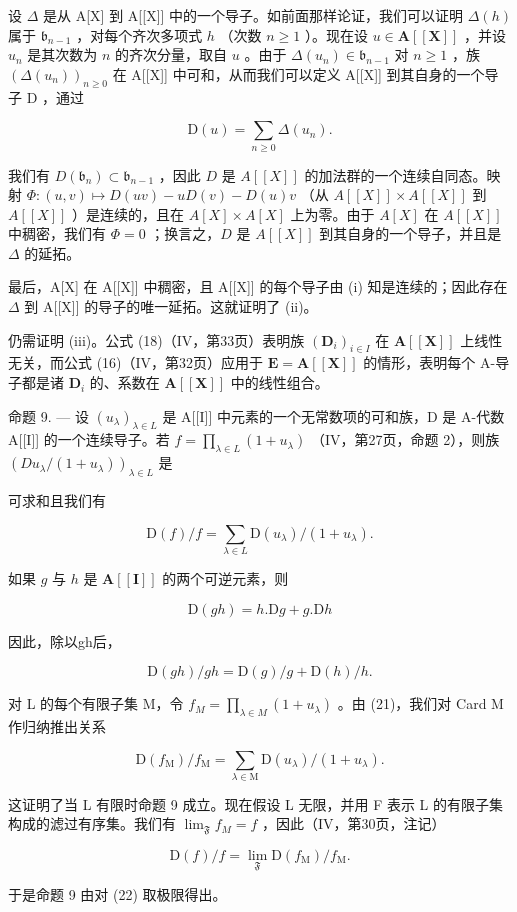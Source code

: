 设 \(\Delta\) 是从 A{[}X{]} 到 A{[}{[}X{]}{]} 中的一个导子。如前面那样论证，我们可以证明 \(\Delta(h)\) 属于 \(\mathfrak{b}_{n-1}\) ，对每个齐次多项式 \(h\) （次数 \(n \geqslant 1\) ）。现在设 \(u \in \mathbf{A}[[\mathbf{X}]]\) ，并设 \(u_n\) 是其次数为 \(n\) 的齐次分量，取自 \(u\) 。由于 \(\Delta(u_n) \in \mathfrak{b}_{n-1}\) 对 \(n \geqslant 1\) ，族 \((\Delta(u_n))_{n \geqslant 0}\) 在 A{[}{[}X{]}{]} 中可和，从而我们可以定义 A{[}{[}X{]}{]} 到其自身的一个导子 D ，通过

\[
\mathrm{D} (u) = \sum_ {n \geqslant 0} \Delta \left(u _ {n}\right).
\]

我们有 \(D(\mathfrak{b}_n) \subset \mathfrak{b}_{n-1}\) ，因此 \(D\) 是 \(A[[X]]\) 的加法群的一个连续自同态。映射 \(\Phi: (u, v) \mapsto D(uv) - uD(v) - D(u)v\) （从 \(A[[X]] \times A[[X]]\) 到 \(A[[X]]\) ）是连续的，且在 \(A[X] \times A[X]\) 上为零。由于 \(A[X]\) 在 \(A[[X]]\) 中稠密，我们有 \(\Phi = 0\) ；换言之，\(D\) 是 \(A[[X]]\) 到其自身的一个导子，并且是 \(\Delta\) 的延拓。

最后，A{[}X{]} 在 A{[}{[}X{]}{]} 中稠密，且 A{[}{[}X{]}{]} 的每个导子由 (i) 知是连续的；因此存在 \(\Delta\) 到 A{[}{[}X{]}{]} 的导子的唯一延拓。这就证明了 (ii)。

仍需证明 (iii)。公式 (18)（IV，第33页）表明族 \((\mathbf{D}_i)_{i\in I}\) 在 \(\mathbf{A}[[\mathbf{X}]]\) 上线性无关，而公式 (16)（IV，第32页）应用于 \(\mathbf{E} = \mathbf{A}[[\mathbf{X}]]\) 的情形，表明每个 A-导子都是诸 \(\mathbf{D}_i\) 的、系数在 \(\mathbf{A}[[\mathbf{X}]]\) 中的线性组合。

命题 9. --- 设 \((u_{\lambda})_{\lambda \in L}\) 是 A{[}{[}I{]}{]} 中元素的一个无常数项的可和族，D 是 A-代数 A{[}{[}I{]}{]} 的一个连续导子。若 \(f = \prod_{\lambda \in L} (1 + u_{\lambda})\) （IV，第27页，命题 2），则族 \((D u_{\lambda} / (1 + u_{\lambda}))_{\lambda \in L}\) 是

可求和且我们有

\[
\mathrm{D} (f) / f = \sum_ {\lambda \in L} \mathrm{D} (u _ {\lambda}) / (1 + u _ {\lambda}).\tag{20}
\]

如果 \(g\) 与 \(h\) 是 \(\mathbf{A}[[\mathbf{I}]]\) 的两个可逆元素，则

\[
\mathrm{D} (g h) = h. \mathrm{D} g + g. \mathrm{D} h
\]

因此，除以gh后，

\[
\mathrm{D} (g h) / g h = \mathrm{D} (g) / g + \mathrm{D} (h) / h.\tag{21}
\]

对 L 的每个有限子集 M，令 \(f_{M} = \prod_{\lambda \in M} (1 + u_{\lambda})\) 。由 (21)，我们对 Card M 作归纳推出关系

\[
\mathrm{D} \left(f _ {\mathrm{M}}\right) / f _ {\mathrm{M}} = \sum_ {\lambda \in \mathrm{M}} \mathrm{D} \left(u _ {\lambda}\right) / \left(1 + u _ {\lambda}\right).\tag{22}
\]

这证明了当 L 有限时命题 9 成立。现在假设 L 无限，并用 F 表示 L 的有限子集构成的滤过有序集。我们有 \(\lim_{\mathfrak{F}} f_{M} = f\) ，因此（IV，第30页，注记）

\[
\mathrm{D} (f) / f = \lim _ {\mathfrak {F}} \mathrm{D} (f _ {\mathrm{M}}) / f _ {\mathrm{M}}.
\]

于是命题 9 由对 (22) 取极限得出。

